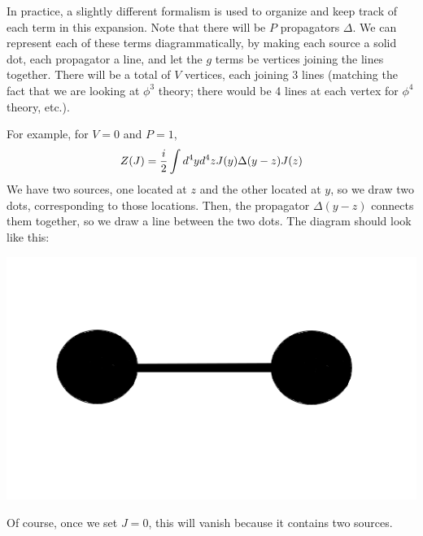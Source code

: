 \documentclass[12pt,epsf]{article}
\def\nolabel{\nonumber }
\def\nolabel{\nonumber }
\begin{document}
In practice, a slightly different formalism is used to organize and
keep track of each term in this  expansion.  Note that there will be
$P$ propagators $\Delta$.  We can represent each of these terms
diagrammatically, by making each source a solid dot, each propagator a
line, and let the $g$ terms be vertices joining the lines together. 
There will be a total of $V$ vertices, each joining 3 lines (matching
the fact that we are looking at $\phi^3$ theory; there would be 4
lines at each vertex for $\phi^4$ theory, etc.).  

For example, for $V=0$ and $P=1$,
\begin{eqnarray}
Z(J) = {i\over 2} \int d^4yd^4z J(y) \Delta(y-z)J(z)\nolabel
\end{eqnarray}
We have two sources, one located at $z$ and the other located at $y$,
so we draw two dots, corresponding to those locations.	Then, the
propagator $\Delta(y-z)$ connects them together, so we draw a line
between the two dots.  The diagram should look like this:
\begin{center}
\includegraphics[scale = .2]{feynmandiagram1.png}
\end{center}
Of course, once we set $J=0$, this will vanish because it contains two
sources.  
\end{document}
